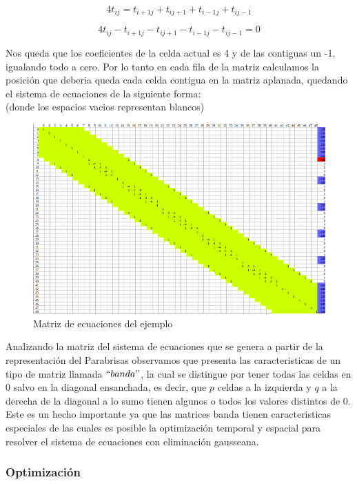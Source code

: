 \[
4 t_{ij} = t_{i+1 j} + t_{i j+1} + t_{i-1 j} + t_{i j-1}
\]

\[
4 t_{ij} - t_{i+1 j} - t_{i j+1} - t_{i-1 j} - t_{i j-1}  = 0
\]

Nos queda que los coeficientes de la celda actual es 4 y de las contiguas un -1, igualando todo a cero.
Por lo tanto en cada fila de la matriz calculamos la posición que deberia queda cada celda contigua en la matriz aplanada, quedando el sistema de ecuaciones de la siguiente forma: \\
(donde los espacios vacios representan blancos)
\begin{figure}
\begin{center}
\includegraphics[scale=0.60]{imagenes/matrizej.png} 
\caption{Matriz de ecuaciones del ejemplo} 
\end{center}
\end{figure}


\newpage

Analizando la matriz del sistema de ecuaciones que se genera a partir de la representación del Parabrisas observamos que presenta las caracteristicas de un tipo de matriz llamada $``banda"$, la cual se distingue por tener todas las celdas en 0 salvo en la diagonal ensanchada, es decir, que $p$ celdas a la izquierda y $q$ a la derecha de la diagonal a lo sumo tienen algunos o todos los valores distintos de 0. 
Este es un hecho importante ya que las matrices banda tienen caracteristicas especiales de las cuales es posible la optimización temporal y espacial para resolver el sistema de ecuaciones con eliminación gausseana.

\subsubsection{Optimización}

